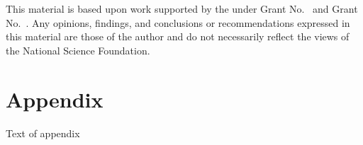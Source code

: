 \documentclass[acmsmall,review,anonymous]{acmart}\settopmatter{printfolios=true,printccs=false,printacmref=false}
\begin{document}

\begin{acks}                            %
  This material is based upon work supported by the
   under Grant
  No.~ and Grant
  No.~.  Any opinions, findings, and
  conclusions or recommendations expressed in this material are those
  of the author and do not necessarily reflect the views of the
  National Science Foundation.
\end{acks}

%

\appendix
\section{Appendix}

Text of appendix
\end{document}
